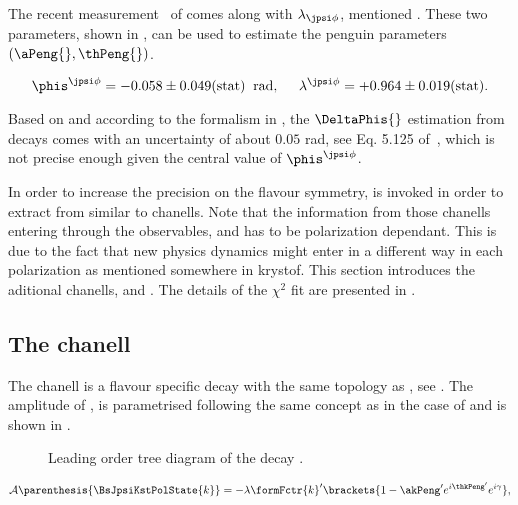 

The recent \lhcb measurement~\cite{phis-3fb-paper} of \phis comes along with $\lambda_{\jpsi\phi}$, mentioned .
These two parameters, shown in , can be used to estimate the penguin parameters $(\aPeng{},\thPeng{})$.

\begin{equation}
  \centering
  \phis^{\jpsi\phi}     =  -0.058 \pm 0.049(\text{stat})  \;\; \text{rad}, \;\;\;\;\;
  \lambda^{\jpsi\phi}   =  +0.964 \pm 0.019(\text{stat}).
  \label{phis_lambda_result}
\end{equation}

\noindent Based on  and according to the formalism in , the $\DeltaPhis{}$ estimation
from \BsJpsiPhi decays comes with an uncertainty of about $0.05$ rad, see Eq. 5.125 of~\cite{DeBruyn-thesis}, which is not precise
enough given the central value of $\phis^{\jpsi\phi}$.

In order to increase the precision on \DeltaPhis{} the \grpsuthree flavour symmetry,
is invoked in order to extract \DeltaPhis{} from similar to \BsJpsiPhi chanells.
Note that the information from those chanells entering through the observables,  and 
has to be polarization dependant. This is due to the fact that new physics dynamics might enter in a different way in each polarization as mentioned {\color{red}somewhere in krystof.}
This section introduces the aditional chanells, \BsJpsiKst and \BdJpsiRho. The details of the $\chi^2$ fit are presented in .


\subsection{The \BsJpsiKst chanell}
The \BsJpsiKst chanell is a flavour specific decay with the same topology as \BsJpsiPhi, see .
The amplitude of \BsJpsiKst, is parametrised following the same concept as in the case of \BsJpsiPhi and is shown in .

\begin{figure}[h]
  \centering
  {\sffamily }
  \caption{Leading order tree diagram of the decay \BsJpsiPhi.}
  \label{bs2jpsikst}
\end{figure}

\begin{equation}
  \mathcal{A} \parenthesis{\BsJpsiKstPolState{k}} = -\lambda \formFctr{k}' \brackets{ 1 - \akPeng' e^{i\thkPeng'} e^{i\gamma} },
  \label{bsjpsikst_amp}
\end{equation}

